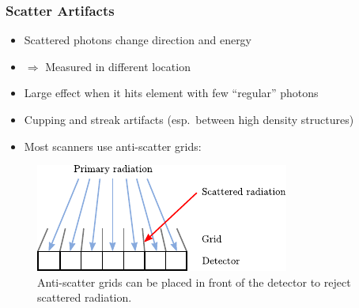 \begin{frame}
	\frametitle{Scatter Artifacts}

	\begin{itemize}
		\item Scattered photons change direction and energy
		\item[ ] $\Rightarrow$ Measured in different location
		\item Large effect when it hits element with few ``regular'' photons

		\item Cupping and streak artifacts (esp.\ between high density structures)
		\item Most scanners use anti-scatter grids:
	\end{itemize}

	\begin{figure}[tbp]
		\centering
		\includegraphics[width=0.6\linewidth]{images/scatter_1}
		\caption{Anti-scatter grids can be placed in front of the detector to reject scattered radiation.}%
		\label{fig:ct_scatter_1}
	\end{figure}

\end{frame}

